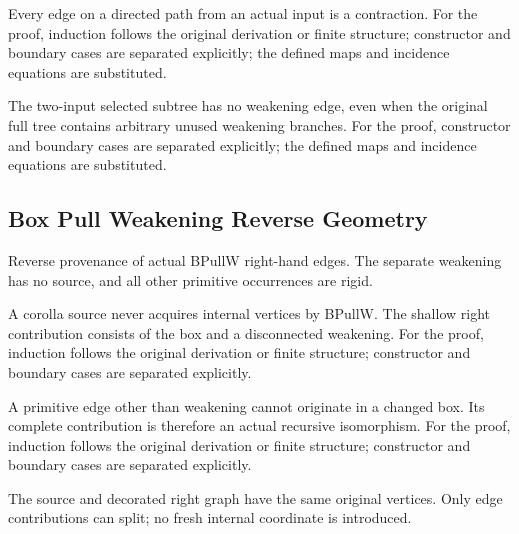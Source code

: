 Every edge on a directed path from an actual input is a contraction.
For the proof, induction follows the original derivation or finite structure; constructor and boundary cases are separated explicitly; the defined maps and incidence equations are substituted.
\par{}

The two-input selected subtree has no weakening edge, even when the original full tree contains arbitrary unused weakening branches.
For the proof, constructor and boundary cases are separated explicitly; the defined maps and incidence equations are substituted.
\par{}

\subsection{Box Pull Weakening Reverse Geometry}
Reverse provenance of actual BPullW right-hand edges. The separate weakening has no source, and all other primitive occurrences are rigid.

A corolla source never acquires internal vertices by BPullW. The shallow right contribution consists of the box and a disconnected weakening.
For the proof, induction follows the original derivation or finite structure; constructor and boundary cases are separated explicitly.
\par{}

A primitive edge other than weakening cannot originate in a changed box. Its complete contribution is therefore an actual recursive isomorphism.
For the proof, induction follows the original derivation or finite structure; constructor and boundary cases are separated explicitly.
\par{}

The source and decorated right graph have the same original vertices. Only edge contributions can split; no fresh internal coordinate is introduced.
\par{}

